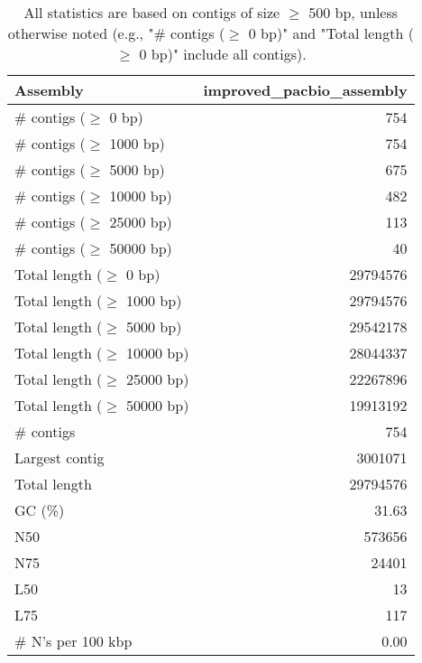 \documentclass[12pt,a4paper]{article}
\begin{document}
\begin{table}[ht]
\begin{center}
\caption{All statistics are based on contigs of size $\geq$ 500 bp, unless otherwise noted (e.g., "\# contigs ($\geq$ 0 bp)" and "Total length ($\geq$ 0 bp)" include all contigs).}
\begin{tabular}{|l*{1}{|r}|}
\hline
Assembly & improved\_pacbio\_assembly \\ \hline
\# contigs ($\geq$ 0 bp) & 754 \\ \hline
\# contigs ($\geq$ 1000 bp) & 754 \\ \hline
\# contigs ($\geq$ 5000 bp) & 675 \\ \hline
\# contigs ($\geq$ 10000 bp) & 482 \\ \hline
\# contigs ($\geq$ 25000 bp) & 113 \\ \hline
\# contigs ($\geq$ 50000 bp) & 40 \\ \hline
Total length ($\geq$ 0 bp) & 29794576 \\ \hline
Total length ($\geq$ 1000 bp) & 29794576 \\ \hline
Total length ($\geq$ 5000 bp) & 29542178 \\ \hline
Total length ($\geq$ 10000 bp) & 28044337 \\ \hline
Total length ($\geq$ 25000 bp) & 22267896 \\ \hline
Total length ($\geq$ 50000 bp) & 19913192 \\ \hline
\# contigs & 754 \\ \hline
Largest contig & 3001071 \\ \hline
Total length & 29794576 \\ \hline
GC (\%) & 31.63 \\ \hline
N50 & 573656 \\ \hline
N75 & 24401 \\ \hline
L50 & 13 \\ \hline
L75 & 117 \\ \hline
\# N's per 100 kbp & 0.00 \\ \hline
\end{tabular}
\end{center}
\end{table}
\end{document}
